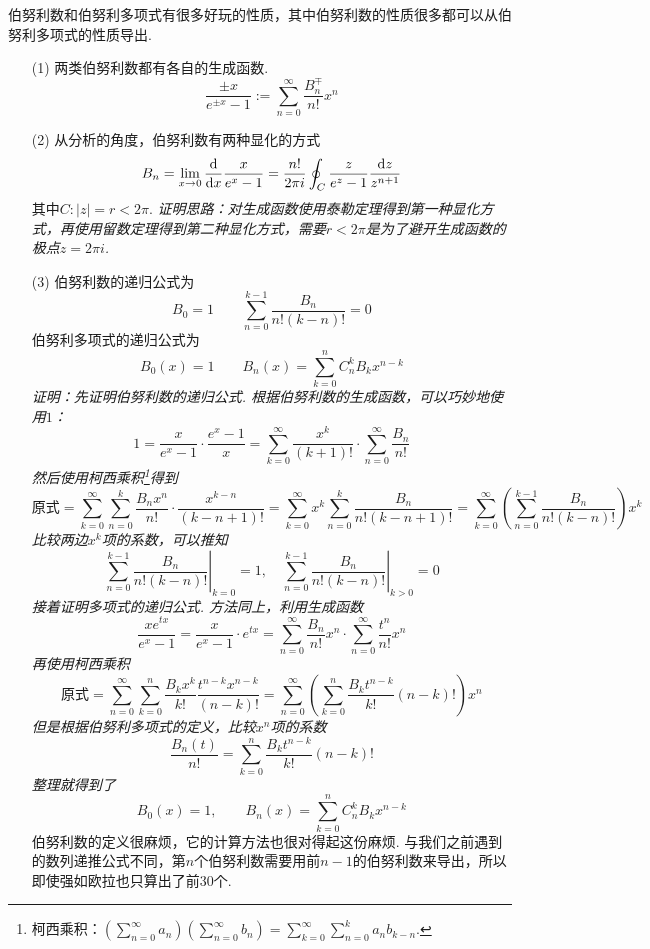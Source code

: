 \documentclass[main.tex]{subfiles}
\begin{document}
伯努利数和伯努利多项式有很多好玩的性质，其中伯努利数的性质很多都可以从伯努利多项式的性质导出.
\begin{itemize}
    \item [(1)] 两类伯努利数都有各自的生成函数.
    \[ \frac{\pm x}{e^{\pm x}-1} := \sum_{n=0}^{\infty}\frac{B_n^\mp}{n!}x^n\]
    \item [(2)] 从分析的角度，伯努利数有两种显化的方式
    \[B_n = \lim_{x \to 0} \frac{{\rm d}}{{\rm d}x} \frac{x}{e^{x}-1} = \frac{n!}{2\pi i}\oint_{C}\frac{z}{e^z-1}\frac{{\rm d}z}{z^{n+1}}\]
    其中\(C:|z|=r<2\pi\).
    \newline
    \textit{
        证明思路：对生成函数使用泰勒定理得到第一种显化方式，再使用留数定理得到第二种显化方式，需要\(r<2\pi\)是为了避开生成函数的极点\(z=2\pi i\).
    }
    \item [(3)] 伯努利数的递归公式为
    \[B_0 = 1 \qquad \sum_{n=0}^{k-1}\frac{B_n}{n!(k-n)!} = 0\]
    伯努利多项式的递归公式为
    \[B_0(x) = 1 \qquad B_n(x) = \sum_{k=0}^{n}C_n^kB_kx^{n-k}\]
    \textit{
        证明：先证明伯努利数的递归公式. 根据伯努利数的生成函数，可以巧妙地使用\(1\)：
        \[ 1=\frac{x}{e^x-1}\cdot\frac{e^x-1}{x} = \sum_{k=0}^{\infty}\frac{x^k}{(k+1)!} \cdot \sum_{n=0}^{\infty}\frac{B_n}{n!}\]
        然后使用柯西乘积\footnote{柯西乘积：\(\displaystyle{\left(\sum_{n=0}^{\infty}a_n\right)\left(\sum_{n=0}^{\infty}b_n\right) = \sum_{k=0}^{\infty}\sum_{n=0}^k a_n b_{k-n}}\).}得到
        \[ \mbox{原式} = \sum_{k=0}^{\infty}\sum_{n=0}^{k}\frac{B_n x^n}{n!}\cdot\frac{x^{k-n}}{(k-n+1)!} = \sum_{k=0}^{\infty}x^k\sum_{n=0}^{k}\frac{B_n}{n!(k-n+1)!} = \sum_{k=0}^{\infty}\left(\sum_{n=0}^{k-1}\frac{B_n}{n!(k-n)!}\right)x^k \]
        比较两边\(x^k\)项的系数，可以推知
        \[ \left.\sum_{n=0}^{k-1}\frac{B_n}{n!(k-n)!}\right|_{k=0}=1, \quad \left.\sum_{n=0}^{k-1}\frac{B_n}{n!(k-n)!}\right|_{k>0}=0\]
        接着证明多项式的递归公式. 方法同上，利用生成函数
        \[\frac{xe^{tx}}{e^{x}-1} = \frac{x}{e^x-1}\cdot e^{tx} = \sum_{n=0}^{\infty}\frac{B_n}{n!}x^n \cdot \sum_{n=0}^{\infty}\frac{t^n}{n!}x^n \]
        再使用柯西乘积
        \[\mbox{原式} = \sum_{n=0}^{\infty}\sum_{k=0}^{n} \frac{B_kx^k}{k!}\frac{t^{n-k}x^{n-k}}{(n-k)!} = \sum_{n=0}^{\infty}\left(\sum_{k=0}^{n}\frac{B_kt^{n-k}}{k!}{(n-k)!}\right)x^n\]
        但是根据伯努利多项式的定义，比较\(x^n\)项的系数
        \[\frac{B_n(t)}{n!} = \sum_{k=0}^{n}\frac{B_kt^{n-k}}{k!}{(n-k)!}\]
        整理就得到了
        \[B_0(x) = 1, \qquad B_n(x) = \sum_{k=0}^{n}C_n^kB_kx^{n-k}\]
    }
    伯努利数的定义很麻烦，它的计算方法也很对得起这份麻烦. 与我们之前遇到的数列递推公式不同，第\(n\)个伯努利数需要用前\(n-1\)的伯努利数来导出，所以即使强如欧拉也只算出了前30个.

\end{itemize}
\end{document}
